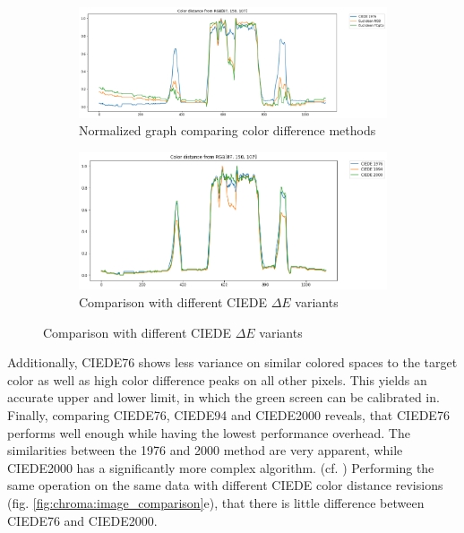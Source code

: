 \begin{figure}[htbp]
\begin{subfigure}[t]{.3\textwidth}
	\end{subfigure}
	\begin{subfigure}[t]{\textwidth}
		\centering
		\includegraphics[width=\textwidth]{gfx/distances/dist-comp.png}
		\caption{Normalized graph comparing color difference methods}
	\end{subfigure}
	\begin{subfigure}[t]{\textwidth}
		\includegraphics[width=\textwidth]{gfx/distances/ciede-comp.png}
		\caption{Comparison with different CIEDE $\Delta E$ variants}
	\end{subfigure}
\end{figure}
Additionally, CIEDE76 shows less variance on similar colored spaces to the 
target color as well as high color difference peaks on all other pixels. This 
yields an accurate upper and lower limit, in which the green screen can be 
calibrated in.
\newline
Finally, comparing CIEDE76, CIEDE94 and CIEDE2000 reveals, that CIEDE76 
performs well enough while having the lowest performance overhead. The 
similarities between the 1976 and 2000 method are very apparent, while 
CIEDE2000 has a significantly more complex algorithm. (cf.  
\cite{sharma:ciede2000:2005}) Performing the same operation on the same data 
with different CIEDE color distance revisions (fig. 
\ref{fig:chroma:image_comparison}e), that there is little difference between 
CIEDE76 and CIEDE2000.